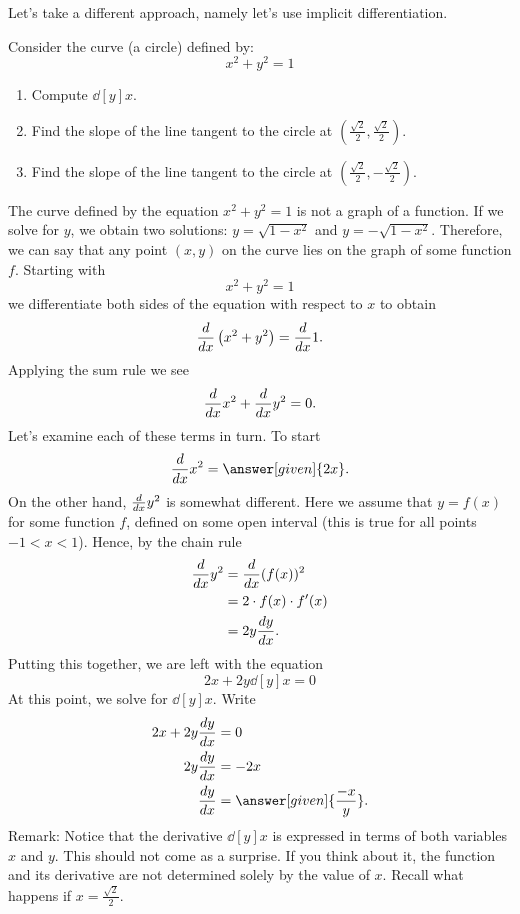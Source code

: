 \documentclass{ximera}
\begin{document}
Let's take a different approach, namely let's use implicit differentiation.
\begin{example}
Consider the curve (a circle) defined by:
\[
x^2 + y^2 = 1
\]
\begin{enumerate}
\item Compute $\dd[y]{x}$.
\item Find the slope of the line tangent to the circle at $\left(\frac{\sqrt{2}}{2},\frac{\sqrt{2}}{2}\right)$.
\item Find the slope of the line tangent to the circle at $\left(\frac{\sqrt{2}}{2},-\frac{\sqrt{2}}{2}\right)$.
\end{enumerate}
\begin{explanation}

The curve defined by the equation  $x^2 + y^2 = 1$ is not a graph of a function. If we solve for $y$, we obtain two solutions:
$y=\sqrt{1-x^2}$ and $y=-\sqrt{1-x^2}$. Therefore, we can say that  any point $(x,y)$ on the curve lies on the graph of some function $f$.
  Starting with 
\[
x^2 + y^2 = 1
\]
we differentiate both sides of the
equation with respect to $x$ to obtain
\[
\ddx \left(x^2+y^2\right) = \ddx 1.
\]
Applying the sum rule we see
\[
\ddx x^2+\ddx y^2 = 0.
\]
Let's examine each of these terms in turn. To start
\[
\ddx x^2 = \answer[given]{2x}.
\]
On the other hand, $\ddx y^2$ is somewhat different. Here we assume that $y = f(x)$ for some function $f$, defined on some open interval (this is true for all points $-1<x<1$). Hence, by the chain rule
\begin{align*}
\ddx y^2 &= \ddx (f(x))^2 \\ 
&= 2\cdot f(x) \cdot f'(x) \\
&= 2y\dd[y]{x}.
\end{align*}
Putting this together, we are left with the equation
\[
2x + 2y\dd[y]{x} =0
\]
At this point, we solve for $\dd[y]{x}$. Write
\begin{align*}
2x + 2y\dd[y]{x} &= 0\\
2y \dd[y]{x} &= -2x\\
\dd[y]{x} &= \answer[given]{\frac{-x}{y}}.
\end{align*}
Remark: Notice that the derivative $\dd[y]{x} $ is expressed in terms of both variables $x$ and $y$. This should not come as a surprise. If you think about it, the function and  its derivative are not determined solely by the value of $x$. Recall what happens if $x=\frac{\sqrt{2}}{2}$.



\end{explanation}
\end{example}
\end{document}
